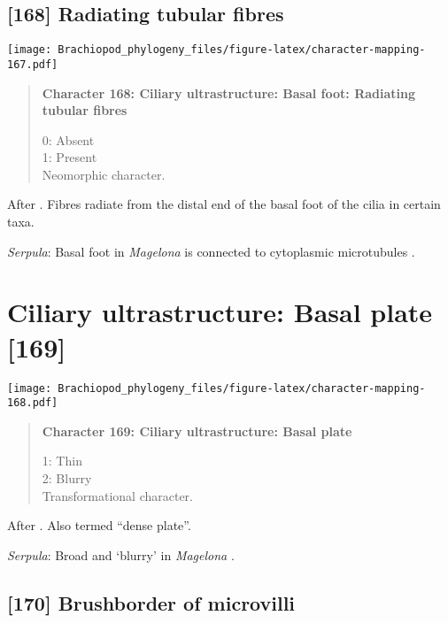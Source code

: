 \documentclass[openany]{book}
\theoremstyle{definition}
\theoremstyle{definition}
\theoremstyle{definition}
\theoremstyle{remark}
\begin{document}
\subsection*{{[}168{]} Radiating tubular
fibres}\label{radiating-tubular-fibres}

\texttt{[image: Brachiopod\_phylogeny\_files/figure-latex/character-mapping-167.pdf]}

\begin{quote}
\textbf{Character 168: Ciliary ultrastructure: Basal foot: Radiating
tubular fibres}

0: Absent\\
1: Present\\
Neomorphic character.
\end{quote}

After \citet{Lundin2009}. Fibres radiate from the distal end of the
basal foot of the cilia in certain taxa.

\hypertarget{Serpula-coding-168}{}
\emph{Serpula}: Basal foot in \emph{Magelona} is connected to
cytoplasmic microtubules \citep{Bartolomaeus1995}.

\section{Ciliary ultrastructure: Basal plate
{[}169{]}}\label{ciliary-ultrastructure-basal-plate-169}

\texttt{[image: Brachiopod\_phylogeny\_files/figure-latex/character-mapping-168.pdf]}

\begin{quote}
\textbf{Character 169: Ciliary ultrastructure: Basal plate}

1: Thin\\
2: Blurry\\
Transformational character.
\end{quote}

After \citet{Lundin2009}. Also termed ``dense plate''.

\hypertarget{Serpula-coding-169}{}
\emph{Serpula}: Broad and `blurry' in \emph{Magelona}
\citep{Bartolomaeus1995}.

\subsection*{{[}170{]} Brushborder of
microvilli}\label{brushborder-of-microvilli}
\end{document}
